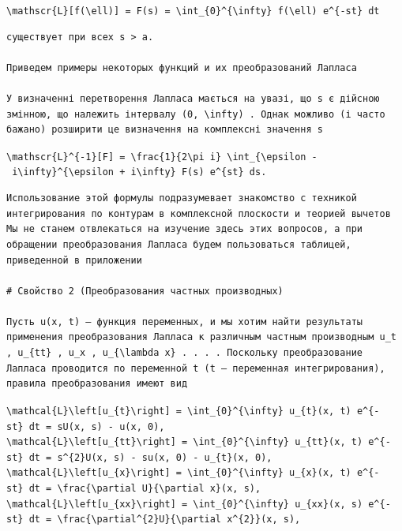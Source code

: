 \documentclass[
  ukrainian,
]{article}
\begin{document}
\texttt{\textbackslash{}mathscr\{L\}{[}f(\textbackslash{}ell){]}\ =\ F(s)\ =\ \textbackslash{}int\_\{0\}\^{}\{\textbackslash{}infty\}\ f(\textbackslash{}ell)\ e\^{}\{-st\}\ dt}

\begin{verbatim}
существует при всех s > a.

Приведем примеры некоторых функций и их преобразований Лапласа

У визначенні перетворення Лапласа мається на увазі, що s є дійсною змінною, що належить інтервалу (0, \infty) . Однак можливо (і часто бажано) розширити це визначення на комплексні значення s
\end{verbatim}

\texttt{\textbackslash{}mathscr\{L\}\^{}\{-1\}{[}F{]}\ =\ \textbackslash{}frac\{1\}\{2\textbackslash{}pi\ i\}\ \textbackslash{}int\_\{\textbackslash{}epsilon\ -\ i\textbackslash{}infty\}\^{}\{\textbackslash{}epsilon\ +\ i\textbackslash{}infty\}\ F(s)\ e\^{}\{st\}\ ds.}

\begin{verbatim}
Использование этой формулы подразумевает знакомство с техникой интегрирования по контурам в комплексной плоскости и теорией вычетов Мы не станем отвлекаться на изучение здесь этих вопросов, а при обращении преобразования Лапласа будем пользоваться таблицей, приведенной в приложении

# Свойство 2 (Преобразования частных производных)

Пусть u(x, t) — функция переменных, и мы хотим найти результаты применения преобразования Лапласа к различным частным производным u_t , u_{tt} , u_x , u_{\lambda x} . . . . Поскольку преобразование Лапласа проводится по переменной t (t — переменная интегрирования), правила преобразования имеют вид
\end{verbatim}

\texttt{\textbackslash{}mathcal\{L\}\textbackslash{}left{[}u\_\{t\}\textbackslash{}right{]}\ =\ \textbackslash{}int\_\{0\}\^{}\{\textbackslash{}infty\}\ u\_\{t\}(x,\ t)\ e\^{}\{-st\}\ dt\ =\ sU(x,\ s)\ -\ u(x,\ 0),}
\texttt{\textbackslash{}mathcal\{L\}\textbackslash{}left{[}u\_\{tt\}\textbackslash{}right{]}\ =\ \textbackslash{}int\_\{0\}\^{}\{\textbackslash{}infty\}\ u\_\{tt\}(x,\ t)\ e\^{}\{-st\}\ dt\ =\ s\^{}\{2\}U(x,\ s)\ -\ su(x,\ 0)\ -\ u\_\{t\}(x,\ 0),}
\texttt{\textbackslash{}mathcal\{L\}\textbackslash{}left{[}u\_\{x\}\textbackslash{}right{]}\ =\ \textbackslash{}int\_\{0\}\^{}\{\textbackslash{}infty\}\ u\_\{x\}(x,\ t)\ e\^{}\{-st\}\ dt\ =\ \textbackslash{}frac\{\textbackslash{}partial\ U\}\{\textbackslash{}partial\ x\}(x,\ s),}
\texttt{\textbackslash{}mathcal\{L\}\textbackslash{}left{[}u\_\{xx\}\textbackslash{}right{]}\ =\ \textbackslash{}int\_\{0\}\^{}\{\textbackslash{}infty\}\ u\_\{xx\}(x,\ s)\ e\^{}\{-st\}\ dt\ =\ \textbackslash{}frac\{\textbackslash{}partial\^{}\{2\}U\}\{\textbackslash{}partial\ x\^{}\{2\}\}(x,\ s),}
\end{document}
